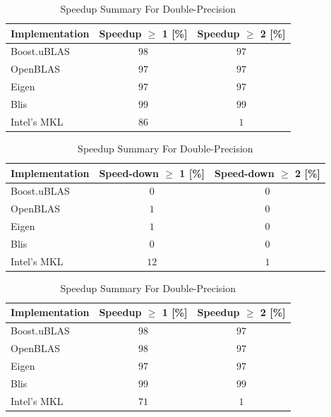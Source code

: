 \begin{table}[ht]
    \centering
    \caption{Speedup Summary For Single-Precision}
    \begin{tabular}{|l|c|c|}
        \hline
        \textbf{Implementation} & \textbf{Speedup $\geq$ 1 [\%]} & \textbf{Speedup $\geq$ 2 [\%]}\\
        \hline
        Boost.uBLAS & $98$ & $97$ \\
        \hline
        OpenBLAS    & $97$ & $97$ \\
        \hline
        Eigen       & $97$ & $97$ \\
        \hline
        Blis        & $99$ & $99$ \\
        \hline
        Intel's MKL & $86$ & $1$ \\
        \hline
    \end{tabular}
    
    \begin{tabular}{|l|c|c|}
        \hline
        \textbf{Implementation} & \textbf{Speed-down $\geq$ 1 [\%]} & \textbf{Speed-down $\geq$ 2 [\%]}\\
        \hline
        Boost.uBLAS & $0$ & $0$ \\
        \hline
        OpenBLAS    & $1$ & $0$ \\
        \hline
        Eigen       & $1$ & $0$ \\
        \hline
        Blis        & $0$ & $0$ \\
        \hline
        Intel's MKL & $12$ & $1$ \\
        \hline
    \end{tabular}
    
    \vspace*{1 cm}

    \centering
    \caption{Speedup Summary For Double-Precision}
    \begin{tabular}{|l|c|c|}
        \hline
        \textbf{Implementation} & \textbf{Speedup $\geq$ 1 [\%]} & \textbf{Speedup $\geq$ 2 [\%]}\\
        \hline
        Boost.uBLAS & $98$ & $97$ \\
        \hline
        OpenBLAS    & $98$ & $97$ \\
        \hline
        Eigen       & $97$ & $97$ \\
        \hline
        Blis        & $99$ & $99$ \\
        \hline
        Intel's MKL & $71$ & $1$ \\
        \hline
    \end{tabular}
    

\end{table}
